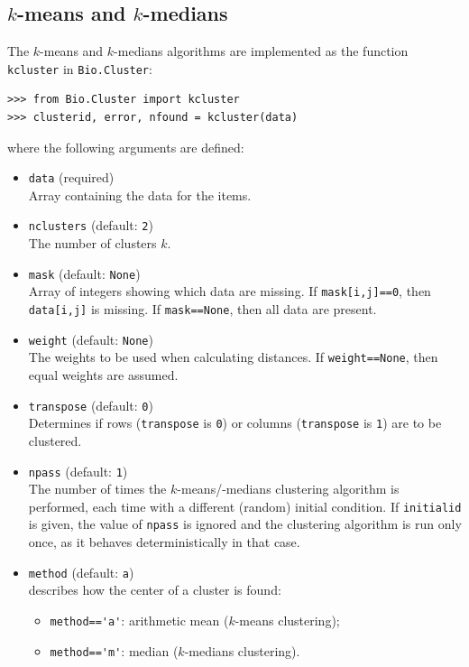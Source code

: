 \documentclass{report}
\begin{document}
\subsection*{$k$-means and $k$-medians}

The $k$-means and $k$-medians algorithms are implemented as the function \verb|kcluster| in \verb|Bio.Cluster|:

\begin{verbatim}
>>> from Bio.Cluster import kcluster
>>> clusterid, error, nfound = kcluster(data)
\end{verbatim}
where the following arguments are defined:
\begin{itemize}
\item \verb|data| (required)\\
Array containing the data for the items.
\item \verb|nclusters| (default: \verb|2|) \\
The number of clusters $k$.
\item \verb|mask| (default: \verb|None|) \\
Array of integers showing which data are missing. If \verb|mask[i,j]==0|, then \verb|data[i,j]| is missing. If \verb|mask==None|, then all data are present.
\item \verb|weight| (default: \verb|None|) \\
The weights to be used when calculating distances. If \verb|weight==None|, then equal weights are assumed.
\item \verb|transpose| (default: \verb|0|) \\
Determines if rows (\verb|transpose| is \verb|0|) or columns (\verb|transpose| is \verb|1|) are to be clustered.
\item \verb|npass| (default: \verb|1|) \\
The number of times the $k$-means/-medians clustering algorithm is performed, each time with a different (random) initial condition. If \verb|initialid| is given, the value of \verb|npass| is ignored and the clustering algorithm is run only once, as it behaves deterministically in that case.
\item \verb|method| (default: \verb|a|) \\
describes how the center of a cluster is found:
\begin{itemize}
\item \verb|method=='a'|: arithmetic mean ($k$-means clustering);
\item \verb|method=='m'|: median ($k$-medians clustering).
\end{itemize}

\end{itemize}
\end{document}
